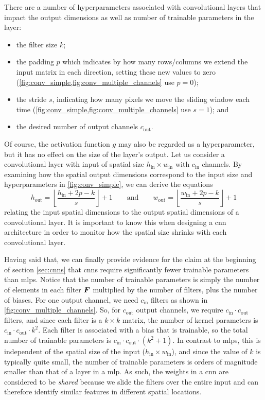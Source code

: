 \documentclass[../report.tex]{subfiles}
\begin{document}
There are a number of hyperparameters associated with convolutional layers that impact the output dimensions as well as number of trainable parameters in the layer:
\begin{itemize}
    \item the filter size $k$;
    \item the padding $p$ which indicates by how many rows/columns we extend the input matrix in each direction, setting these new values to zero (\cref{fig:conv_simple,fig:conv_multiple_channels} use $p=0$);
    \item the stride $s$, indicating how many pixels we move the sliding window each time (\cref{fig:conv_simple,fig:conv_multiple_channels} use $s=1$); and
    \item the desired number of output channels $c_\text{out}$.
\end{itemize}
Of course, the activation function $g$ may also be regarded as a hyperparameter, but it has no effect on the size of the layer's output.
Let us consider a convolutional layer with input of spatial size $h_\text{in} \times w_\text{in}$ with $c_\text{in}$ channels.
By examining how the spatial output dimensions correspond to the input size and hyperparameters in \cref{fig:conv_simple}, we can derive the equations
\begin{equation}
    \label{eq:cnn_output_size}
    h_\text{out} = \left\lfloor \frac{h_\text{in} + 2p - k }{s} \right\rfloor + 1 \qquad \text{and} \qquad
    w_\text{out} = \left\lfloor \frac{w_\text{in} + 2p - k }{s} \right\rfloor + 1
\end{equation}
relating the input spatial dimensions to the output spatial dimensions of a convolutional layer.
It is important to know this when designing a \gls{cnn} architecture in order to monitor how the spatial size shrinks with each convolutional layer.

Having said that, we can finally provide evidence for the claim at the beginning of section \cref{sec:cnns} that \glspl{cnn} require significantly fewer trainable parameters than \glspl{mlp}.
Notice that the number of trainable parameters is simply the number of elements in each filter ${\bm{F}}$ multiplied by the number of filters, plus the number of biases.
For one output channel, we need $c_\text{in}$ filters as shown in \cref{fig:conv_multiple_channels}.
So, for $c_\text{out}$ output channels, we require $c_\text{in} \cdot c_\text{out}$ filters, and since each filter is a $k \times k$ matrix, the number of kernel parameters is
$c_\text{in} \cdot c_\text{out} \cdot k^2$.
Each filter is associated with a bias that is trainable, so the total number of trainable parameters is 
$c_\text{in} \cdot c_\text{out} \cdot (k^2+1)$.
In contrast to \glspl{mlp}, this is independent of the spatial size of the input ($h_\text{in} \times w_\text{in}$), and since the value of $k$ is typically quite small, the number of trainable parameters is orders of magnitude smaller than that of a layer in a \gls{mlp}.
As such, the weights in a \gls{cnn} are considered to be \emph{shared} because we slide the filters over the entire input and can therefore identify similar features in different spatial locations.
\end{document}
